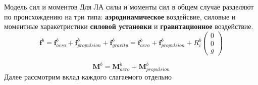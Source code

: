 \documentclass[aspectratio=169, plain, 14pt]{beamer}
\begin{document}
\begin{frame}{Модель сил и моментов}
	\justifying\small
	Для ЛА силы и моменты сил в общем случае разделяют по происхождению на три типа: \textbf{аэродинамическое} воздейсвие, силовые и моментные харакетристики \textbf{силовой установки} и \textbf{гравитационное} воздействие.
	$$
	\boldsymbol{f}^b = \boldsymbol{f}^b_{aero} + \boldsymbol{f}^b_{propulsion} + \boldsymbol{f}^b_{gravity} = \boldsymbol{f}^b_{aero} + \boldsymbol{f}^b_{propulsion} + R_i^b 
	\begin{pmatrix}
		0 \\ 0 \\ g 
	\end{pmatrix}
	$$ 
	
	$$
	\boldsymbol{M}^b = \boldsymbol{M}^b_{aero} + \boldsymbol{M}^b_{propulsion}
	$$
	\justifying\small
	Далее рассмотрим вклад каждого слагаемого отдельно
\end{frame}
\end{document}
